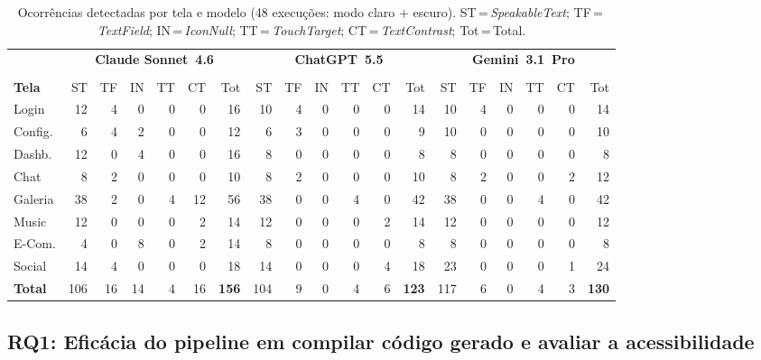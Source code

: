 \documentclass[sigconf,anonymous,review]{webmedia}
\begin{document}
\begin{table}[htb]
\centering
\caption{Ocorrências detectadas por tela e modelo (48 execuções: modo claro + escuro).
  ST\,=\,\textit{SpeakableText}; TF\,=\,\textit{TextField};
  IN\,=\,\textit{IconNull}; TT\,=\,\textit{TouchTarget};
  CT\,=\,\textit{TextContrast}; Tot\,=\,Total.}
\label{tab:results}
\setlength{\tabcolsep}{4pt}
{\scriptsize
\begin{tabular*}{\textwidth}{@{\extracolsep{\fill}} l rrrrrr rrrrrr rrrrrr}
\toprule
& \multicolumn{6}{c}{\textbf{Claude Sonnet~4.6}}
& \multicolumn{6}{c}{\textbf{ChatGPT~5.5}}
& \multicolumn{6}{c}{\textbf{Gemini~3.1~Pro}} \\ \\
\cmidrule(lr){2-7}\cmidrule(lr){8-13}\cmidrule(lr){14-19}
\textbf{Tela}
  & ST & TF & IN & TT & CT & Tot
  & ST & TF & IN & TT & CT & Tot
  & ST & TF & IN & TT & CT & Tot \\
\midrule
Login    & 12 & 4 &  0 & 0 &  0 & 16 & 10 & 4 & 0 & 0 & 0 & 14 & 10 & 4 &  0 & 0 & 0 & 14 \\
Config.  &  6 & 4 &  2 & 0 &  0 & 12 &  6 & 3 & 0 & 0 & 0 &  9 & 10 & 0 &  0 & 0 & 0 & 10 \\
Dashb.   & 12 & 0 &  4 & 0 &  0 & 16 &  8 & 0 & 0 & 0 & 0 &  8 &  8 & 0 &  0 & 0 & 0 &  8 \\
Chat     &  8 & 2 &  0 & 0 &  0 & 10 &  8 & 2 & 0 & 0 & 0 & 10 &  8 & 2 &  0 & 0 & 2 & 12 \\
Galeria  & 38 & 2 &  0 & 4 & 12 & 56 & 38 & 0 & 0 & 4 & 0 & 42 & 38 & 0 &  0 & 4 & 0 & 42 \\
Music    & 12 & 0 &  0 & 0 &  2 & 14 & 12 & 0 & 0 & 0 & 2 & 14 & 12 & 0 &  0 & 0 & 0 & 12 \\
E-Com.   &  4 & 0 &  8 & 0 &  2 & 14 &  8 & 0 & 0 & 0 & 0 &  8 &  8 & 0 &  0 & 0 & 0 &  8 \\
Social   & 14 & 4 &  0 & 0 &  0 & 18 & 14 & 0 & 0 & 0 & 4 & 18 & 23 & 0 &  0 & 0 & 1 & 24 \\
\midrule
\textbf{Total}
  & 106 & 16 & 14 & 4 & 16 & \textbf{156}
  & 104 &  9 &  0 & 4 &  6 & \textbf{123}
  & 117 &  6 &  0 & 4 &  3 & \textbf{130} \\
\bottomrule
\end{tabular*}
}
\end{table}

\subsection{RQ1: Eficácia do pipeline em compilar código gerado e
avaliar a acessibilidade}
\end{document}
